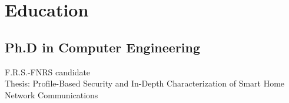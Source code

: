 \documentclass[]{deedy-resume-openfont}
\begin{document}
\begin{minipage}[t]{0.60\textwidth}




\section{Education}

\subsection{Ph.D in Computer Engineering}
F.R.S.-FNRS candidate \\
Thesis: Profile-Based Security and In-Depth Characterization of Smart Home Network Communications
\sectionsep


\end{minipage}
\end{document}

